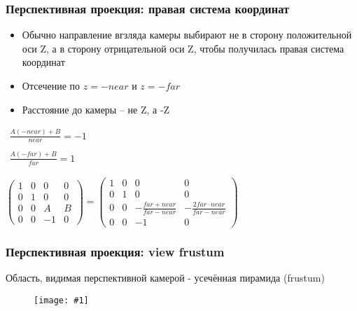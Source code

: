 \documentclass{beamer}
\newcommand{\slideimage}[1]{
  \begin{figure}
    \begin{adjustbox}{width=\textwidth, totalheight=\textheight-2\baselineskip-2\baselineskip,keepaspectratio}
      \texttt{[image: \#1]}
    \end{adjustbox}
  \end{figure}
}
\begin{document}
\begin{frame}[fragile]
\frametitle{Перспективная проекция: правая система координат}
\begin{itemize}
\item Обычно направление вгзляда камеры выбирают не в сторону положительной оси Z, а в сторону отрицательной оси Z, чтобы получилась правая система координат
\pause
\item Отсечение по \begin{math}z=-near\end{math} и \begin{math}z=-far\end{math}
\pause
\item Расстояние до камеры -- не Z, а -Z
\end{itemize}
\pause
\begin{center}
\begin{math}
\begin{matrix}
\frac{A(-near)+B}{near} = -1 \\ \\
\frac{A(-far)+B}{far} = 1
\end{matrix}
\end{math}
\end{center}
\pause
\begin{center}
\begin{math}
\begin{pmatrix}
1 & 0 & 0 & 0 \\
0 & 1 & 0 & 0 \\
0 & 0 & A & B \\
0 & 0 & -1 & 0
\end{pmatrix}
=
\begin{pmatrix}
1 & 0 & 0 & 0 \\
0 & 1 & 0 & 0 \\
0 & 0 & -\frac{far + near}{far - near} & -\frac{2 far \cdot near}{far - near} \\
0 & 0 & -1 & 0
\end{pmatrix}
\end{math}
\end{center}
\end{frame}

\begin{frame}[fragile]
\frametitle{Перспективная проекция: view frustum}
Область, видимая перспективной камерой - усечённая пирамида (frustum)
\slideimage{frustum.png}
\end{frame}
\end{document}
